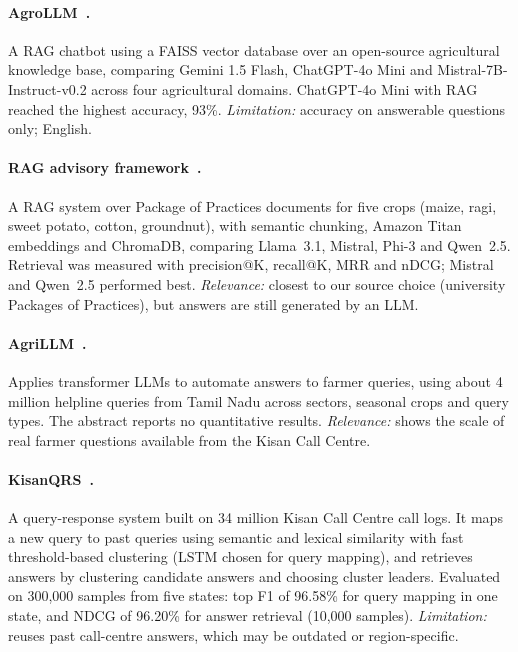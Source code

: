 \paragraph{AgroLLM~\cite{samuel2025agrollm}.}
A RAG chatbot using a FAISS vector database over an open-source agricultural knowledge base,
comparing Gemini 1.5 Flash, ChatGPT-4o Mini and Mistral-7B-Instruct-v0.2 across four
agricultural domains. ChatGPT-4o Mini with RAG reached the highest accuracy, 93\%.
\emph{Limitation:} accuracy on answerable questions only; English.

\paragraph{RAG advisory framework~\cite{sawant2026empowering}.}
A RAG system over Package of Practices documents for five crops (maize, ragi, sweet potato,
cotton, groundnut), with semantic chunking, Amazon Titan embeddings and ChromaDB, comparing
Llama~3.1, Mistral, Phi-3 and Qwen~2.5. Retrieval was measured with precision@K, recall@K,
MRR and nDCG; Mistral and Qwen~2.5 performed best. \emph{Relevance:} closest to our source
choice (university Packages of Practices), but answers are still generated by an LLM.

\paragraph{AgriLLM~\cite{didwania2024agrillm}.}
Applies transformer LLMs to automate answers to farmer queries, using about 4 million
helpline queries from Tamil Nadu across sectors, seasonal crops and query types. The
abstract reports no quantitative results. \emph{Relevance:} shows the scale of real farmer
questions available from the Kisan Call Centre.

\paragraph{KisanQRS~\cite{rehman2024kisanqrs}.}
A query-response system built on 34 million Kisan Call Centre call logs. It maps a new query
to past queries using semantic and lexical similarity with fast threshold-based clustering
(LSTM chosen for query mapping), and retrieves answers by clustering candidate answers and
choosing cluster leaders. Evaluated on 300,000 samples from five states: top F1 of 96.58\%
for query mapping in one state, and NDCG of 96.20\% for answer retrieval (10,000 samples).
\emph{Limitation:} reuses past call-centre answers, which may be outdated or region-specific.

